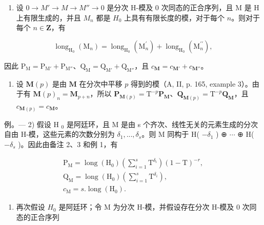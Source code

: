 \begin{enumerate}
\def\labelenumi{\arabic{enumi})}
\setcounter{enumi}{1}
\tightlist
\item
  设 \(0 \to M' \to M \to M'' \to 0\) 是分次 H-模及 0 次同态的正合序列，且 M 是 H 上有限生成的，并且 \(M_n\) 都是 \(H_0\) 上具有有限长度的模，对于每个 \(n\)。则对于每个 \(n \in \mathbf{Z}\)，有
\end{enumerate}

\[
\operatorname{long} _ {\mathrm{H} _ {0}} \left(\mathrm{M} _ {n}\right) = \operatorname{long} _ {\mathrm{H} _ {0}} \left(\mathrm{M} _ {n} ^ {\prime}\right) + \operatorname{long} _ {\mathrm{H} _ {0}} \left(\mathrm{M} _ {n} ^ {\prime \prime}\right),
\]

因此 \(\mathrm{P_M} = \mathrm{P_{M'}} + \mathrm{P_{M''}}\)、\(\mathrm{Q_M} = \mathrm{Q_{M'}} + \mathrm{Q_{M''}}\)，且 \(c_{\mathbf{M}} = c_{\mathbf{M'}} + c_{\mathbf{M''}}\)。

\begin{enumerate}
\def\labelenumi{\arabic{enumi})}
\setcounter{enumi}{2}
\tightlist
\item
  设 \(\mathbf{M}(p)\) 是由 \(\mathbf{M}\) 在分次中平移 \(p\) 得到的模（A, II, p. 165, example 3）。由于有 \(\mathbf{M}(p)_n = \mathbf{M}_{p+n}\)，所以 \(\mathbf{P}_{\mathbf{M}(p)} = \mathrm{T}^{-p}\mathbf{P}_{\mathbf{M}}\)、\(\mathbf{Q}_{\mathbf{M}(p)} = \mathrm{T}^{-p}\mathbf{Q}_{\mathbf{M}}\)，且 \(c_{\mathbf{M}(p)} = c_{\mathbf{M}}\)。
\end{enumerate}

例。--- 2) 假设 H \(_{0}\) 是阿廷环，且 M 是由 s 个齐次、线性无关的元素生成的分次自由 H-模，这些元素的次数分别为 \(\delta_{1}, ..., \delta_{s}\)。则 M 同构于 H( \(-\delta_{1}\) ) ⊕ \(\cdots\) ⊕ H( \(-\delta_{s}\) )。因此由备注 2、3 和例 1，有

\[
\begin{array}{l} \mathrm {P_ {M}} = \operatorname{long} (\mathrm {H_ {0}}) \left(\sum_ {i = 1} ^ {s} \mathrm{T} ^ {\delta_ {i}}\right) (1 - \mathrm{T}) ^ {- r}, \\ \mathrm {Q_ {M}} = \operatorname{long} (\mathrm {H_ {0}}) \left(\sum_ {i = 1} ^ {s} \mathrm{T} ^ {\delta_ {i}}\right), \\ c _ {\mathrm{M}} = s. \operatorname{long} (\mathrm {H_ {0}}). \end{array}
\]

\begin{enumerate}
\def\labelenumi{\arabic{enumi})}
\setcounter{enumi}{2}
\tightlist
\item
  再次假设 \(H_{0}\) 是阿廷环；令 M 为分次 H-模，并假设存在分次 H-模及 0 次同态的正合序列
\end{enumerate}

